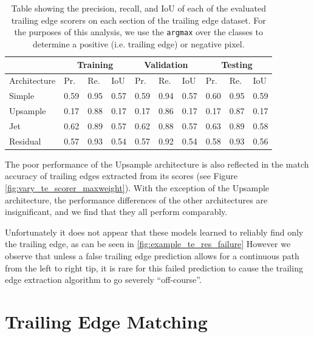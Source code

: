 \begin{table}[!htb]%
	\centering
	\resizebox{\linewidth}{!}
	{
		\begin{tabular} {l || l | l | l || l | l | l || l | l | l |}
		& \multicolumn{3}{c||}{Training} & \multicolumn{3}{c||}{Validation} & \multicolumn{3}{c|}{Testing} \\
		\hline
		Architecture & Pr. & Re. & IoU & Pr. & Re. & IoU & Pr. & Re. & IoU \\
		\hhline{=#===#===#===|}
		Simple & 0.59 & 0.95 & 0.57 & 0.59 & 0.94 & 0.57 & 0.60 & 0.95 & 0.59 \\
		\hline
		Upsample & 0.17 & 0.88 & 0.17 & 0.17 & 0.86 & 0.17 & 0.17 & 0.87 & 0.17 \\
		\hline
		Jet & 0.62 & 0.89 & 0.57 & 0.62 & 0.88 & 0.57 & 0.63 & 0.89 & 0.58 \\
		\hline
		Residual & 0.57 & 0.93 & 0.54 & 0.57 & 0.92 & 0.54 & 0.58 & 0.93 & 0.56 \\
		\hline
		\end{tabular}
	}
	\caption{Table showing the precision, recall, and IoU of each of the evaluated trailing edge scorers on each section of the trailing edge dataset. For the purposes of this analysis, we use the \texttt{argmax} over the classes to determine a positive (i.e. trailing edge) or negative pixel.}
	\label{tab:te_score_full_analysis}
\end{table}

The poor performance of the Upsample architecture is also reflected in the match accuracy of trailing edges extracted from its scores (see Figure \ref{fig:vary_te_scorer_maxweight}).
With the exception of the Upsample architecture, the performance differences of the other architectures are insignificant, and we find that they all perform comparably.

Unfortunately it does not appear that these models learned to reliably find only the trailing edge, as can be seen in \ref{fig:example_te_res_failure}
However we observe that unless a false trailing edge prediction allows for a continuous path from the left to right tip, it is rare for this failed prediction to cause the trailing edge extraction algorithm to go severely ``off-course''.

\section{Trailing Edge Matching}

